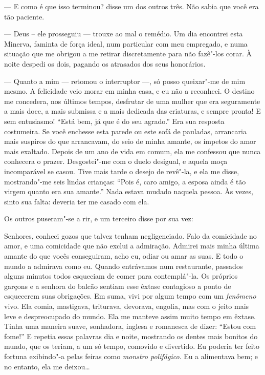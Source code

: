 --- E como é que isso terminou? disse um dos outros três. Não sabia que
você era tão paciente.

--- Deus – ele prosseguiu --- trouxe ao mal o remédio. Um dia encontrei esta
Minerva, faminta de força ideal, num particular com meu empregado, e
numa situação que me obrigou a me retirar discretamente para não
fazê"-los corar. À noite despedi os dois, pagando os atrasados dos seus
honorários.

\quebra

--- Quanto a mim --- retomou o interruptor ---, só posso queixar"-me de mim
mesmo. A felicidade veio morar em minha casa, e eu não a reconheci. O
destino me concedera, nos últimos tempos, desfrutar de uma
mulher que era seguramente a mais doce, a mais submissa e a mais
dedicada das criaturas, e sempre pronta! E sem entusiasmo!
“Está bem, já que é do seu agrado.'' Era
sua resposta costumeira. Se você enchesse esta parede ou
este sofá de pauladas, arrancaria mais suspiros do que arrancavam, do seio de
minha amante, os ímpetos do amor mais exaltado. Depois de um ano de
vida em comum, ela me confessou que nunca conhecera o prazer.
Desgostei"-me com o duelo desigual, e aquela moça incomparável se
casou. Tive mais tarde o desejo de revê"-la, e ela me disse,
mostrando"-me seis lindas crianças: “Pois é, caro
amigo, a esposa ainda é tão virgem quanto era sua
amante.'' Nada estava mudado naquela pessoa. Às vezes,
sinto sua falta: deveria ter me casado com ela.

Os outros puseram"-se a rir, e um terceiro disse por sua vez:

Senhores, conheci gozos que talvez tenham negligenciado.
Falo da comicidade no amor, e uma comicidade que não exclui a
admiração. Admirei mais minha última amante do que vocês conseguiram,
acho eu, odiar ou amar as suas. E todo o mundo a admirava como
eu. Quando entrávamos num restaurante, passados alguns minutos todos
esqueciam de comer para contemplá"-la. Os próprios garçons e a senhora
do balcão sentiam esse êxtase contagioso a ponto de esquecerem suas
obrigações. Em suma, vivi por algum tempo com um \textit{fenômeno}
vivo. Ela comia, mastigava, triturava, devorava, engolia, mas com o
jeito mais leve e despreocupado do mundo. Ela me manteve assim 
muito tempo em êxtase. Tinha uma maneira suave, sonhadora, inglesa
e romanesca de dizer: “Estou com fome!'' E
repetia essas palavras dia e noite, mostrando os dentes mais bonitos do
mundo, que os teriam, a um só tempo, comovido e divertido. Eu
poderia ter feito fortuna exibindo"-a pelas feiras como \textit{monstro
polifágico}. Eu a alimentava bem; e no entanto, ela me deixou\ldots\ 

